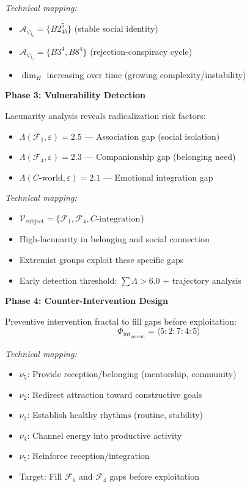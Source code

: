 \documentclass[11pt,twoside]{book}
\newcommand{\noe}[1]{\nu_{#1}}
\newcommand{\Foundations}{\mathcal{F}}
\newcommand{\HausdorffDim}{\dim_H}
\newcommand{\Lacunarity}{\Lambda}
\newcommand{\PsychAttractor}{\mathcal{A}_\psi}
\newcommand{\ManipFrac}{\Phi_{\mathrm{int}}}
\newcommand{\VulnSet}{\mathcal{V}}
\begin{document}
\begin{tcolorbox}[colback=yellow!5!white,colframe=yellow!65!black,title=\textbf{Scenario 4: Security Application --- Radicalization Detection},breakable]
\textit{Technical mapping:}
\begin{itemize}
    \item $\PsychAttractor_{t_0} = \{B2^5_{4b}\}$ (stable social identity)
    \item $\PsychAttractor_{t_1} = \{B3^4, B8^4\}$ (rejection-conspiracy cycle)
    \item $\HausdorffDim$ increasing over time (growing complexity/instability)
\end{itemize}

\textbf{Phase 3: Vulnerability Detection}

Lacunarity analysis reveals radicalization risk factors:
\begin{itemize}
    \item $\Lacunarity(\Foundations_1, \varepsilon) = 2.5$ --- Association gap (social isolation)
    \item $\Lacunarity(\Foundations_4, \varepsilon) = 2.3$ --- Companionship gap (belonging need)
    \item $\Lacunarity(C\text{-world}, \varepsilon) = 2.1$ --- Emotional integration gap
\end{itemize}

\textit{Technical mapping:}
\begin{itemize}
    \item $\VulnSet_{\mathrm{subject}} = \{\Foundations_1, \Foundations_4, C\text{-integration}\}$
    \item High-lacunarity in belonging and social connection
    \item Extremist groups exploit these specific gaps
    \item Early detection threshold: $\sum \Lacunarity > 6.0$ + trajectory analysis
\end{itemize}

\textbf{Phase 4: Counter-Intervention Design}

Preventive intervention fractal to fill gaps before exploitation:
\[
    \ManipFrac_{\mathrm{prevent}} = \langle 5:2:7:4:5 \rangle
\]

\textit{Technical mapping:}
\begin{itemize}
    \item $\noe{5}$: Provide reception/belonging (mentorship, community)
    \item $\noe{2}$: Redirect attraction toward constructive goals
    \item $\noe{7}$: Establish healthy rhythms (routine, stability)
    \item $\noe{4}$: Channel energy into productive activity
    \item $\noe{5}$: Reinforce reception/integration
    \item Target: Fill $\Foundations_1$ and $\Foundations_4$ gaps before exploitation
\end{itemize}


\end{tcolorbox}
\end{document}
